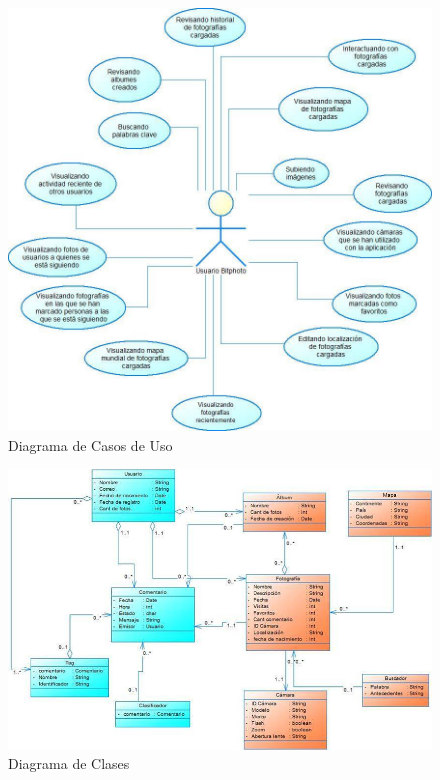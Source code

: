 \documentclass{memoria}
\begin{document}
\begin{figure}[hbtp]
 \centering
 \includegraphics[width=15cm]{DiagramaDeCasosDeUso.jpg}
 \caption{Diagrama de Casos de Uso}
 \end{figure}
  



\begin{figure}[hbtp]
\centering
\includegraphics[width=17cm]{DiagramaDeClases.jpg}
\caption{Diagrama de Clases}
\end{figure}
\end{document}
